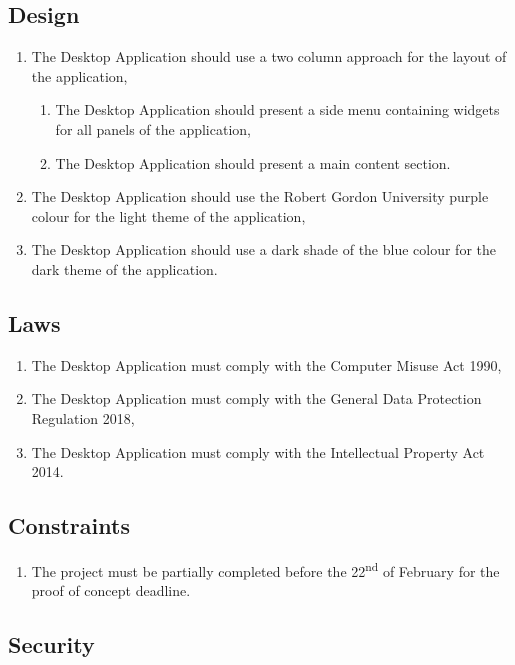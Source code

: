 \subsection{Design}

\begin{enumerate}
    \item The Desktop Application should use a two column approach for the layout of the application,
    \begin{enumerate}
        \item The Desktop Application should present a side menu containing widgets for all panels of
              the application,
        \item The Desktop Application should present a main content section.
    \end{enumerate}
    \item The Desktop Application should use the Robert Gordon University purple colour for the light theme of
          the application,
    \item The Desktop Application should use a dark shade of the blue colour for the dark theme of
          the application.
\end{enumerate}

\subsection{Laws}

\begin{enumerate}
    \item The Desktop Application must comply with the Computer Misuse Act 1990,
    \item The Desktop Application must comply with the General Data Protection Regulation 2018,
    \item The Desktop Application must comply with the Intellectual Property Act 2014.
\end{enumerate}

\subsection{Constraints}

\begin{enumerate}
    \item The project must be partially completed before the 22\textsuperscript{nd} of February
          for the proof of concept deadline.
\end{enumerate}

\subsection{Security}

